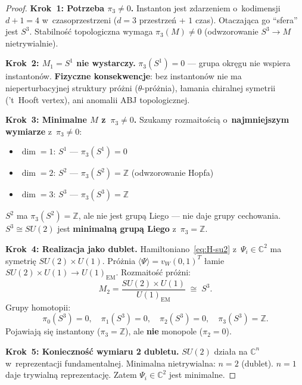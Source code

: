 \begin{proof}
\textbf{Krok~1: Potrzeba $\pi_3 \neq 0$.}
Instanton jest zdarzeniem o~kodimensji $d + 1 = 4$
w~czasoprzestrzeni ($d = 3$ przestrze\'n + $1$ czas).
Otaczaj\k{a}ca go ``sfera'' jest $S^3$.
Stabilno\'s\'c topologiczna wymaga
$\pi_3(M) \neq 0$ (odwzorowanie $S^3 \to M$ nietrywialnie).

\textbf{Krok~2: $M_1 = S^1$ nie wystarczy.}
$\pi_3(S^1) = 0$ --- grupa okr\k{e}gu nie wspiera instanton\'ow.
\textbf{Fizyczne konsekwencje}: bez instanton\'ow nie ma
nieperturbacyjnej struktury pr\'o\.zni ($\theta$-pr\'o\.znia),
\l{}amania chiralnej symetrii (\textquoteright t~Hooft vertex),
ani anomalii ABJ topologicznej.

\textbf{Krok~3: Minimalne $M$ z~$\pi_3 \neq 0$.}
Szukamy rozmaito\'sci\k{a} o~\textbf{najmniejszym wymiarze}
z~$\pi_3 \neq 0$:
\begin{itemize}[nosep]
  \item $\dim = 1$: $S^1$ --- $\pi_3(S^1) = 0$ \xmark
  \item $\dim = 2$: $S^2$ --- $\pi_3(S^2) = \mathbb{Z}$
    (odwzorowanie Hopfa) \cmark
  \item $\dim = 3$: $S^3$ --- $\pi_3(S^3) = \mathbb{Z}$ \cmark
\end{itemize}
$S^2$ ma $\pi_3(S^2) = \mathbb{Z}$, ale nie jest grup\k{a} Liego
--- nie daje grupy cechowania.
$S^3 \cong SU(2)$ jest \textbf{minimaln\k{a} grup\k{a} Liego}
z~$\pi_3 = \mathbb{Z}$.

\textbf{Krok~4: Realizacja jako dublet.}
Hamiltoniano~\eqref{eq:H-su2} z~$\Psi_i \in \mathbb{C}^2$
ma symetri\k{e} $SU(2) \times U(1)$. Pr\'o\.znia
$\langle\Psi\rangle = v_W(0,1)^T$ \l{}amie
$SU(2) \times U(1) \to U(1)_{\mathrm{EM}}$.
Rozmaito\'s\'c pr\'o\.zni:
\begin{equation}\label{eq:D2-vacuum-SU2}
  M_2 = \frac{SU(2) \times U(1)}{U(1)_{\mathrm{EM}}} \;\cong\; S^3.
\end{equation}
Grupy homotopii:
\begin{equation}\label{eq:D2-pi-S3}
  \pi_0(S^3) = 0, \quad
  \pi_1(S^3) = 0, \quad
  \pi_2(S^3) = 0, \quad
  \pi_3(S^3) = \mathbb{Z}.
\end{equation}
Pojawiaj\k{a} si\k{e} instantony ($\pi_3 = \mathbb{Z}$), ale
\textbf{nie} monopole ($\pi_2 = 0$).

\textbf{Krok~5: Konieczno\'s\'c wymiaru 2 dubletu.}
$SU(2)$ dzia\l{}a na $\mathbb{C}^n$ w~reprezentacji fundamentalnej.
Minimalna nietrywialna: $n = 2$ (dublet). $n = 1$ daje
trywialn\k{a} reprezentacj\k{e}. Zatem $\Psi_i \in \mathbb{C}^2$
jest minimalne.
\end{proof}

